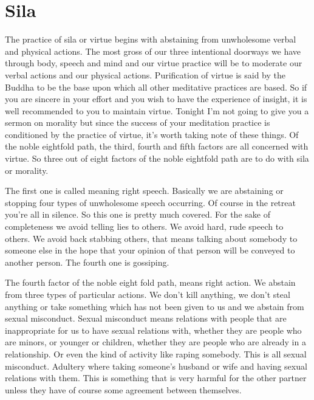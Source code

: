 \documentclass[letterpaper,10pt,english]{sphinxmanual}
\begin{document}
\section{Sila}
\label{\detokenize{0-b:sila}}
\sphinxAtStartPar
The  practice  of  sila  or  virtue  begins  with  abstaining  from  unwholesome  verbal  and  physical  actions. The  most  gross  of  our  three  intentional
doorways we have through body, speech and mind and our virtue practice
will be to moderate our verbal actions and our physical actions. Purification
of virtue is said by the Buddha to be the base upon which all other meditative practices are based. So if you are sincere in your effort and you wish to
have the experience of insight, it is well recommended to you to maintain
virtue. Tonight I’m not going to give you a sermon on morality but since the
success of your meditation practice is conditioned by the practice of virtue,
it’s worth taking note of these things. Of the noble eightfold path, the third,
fourth and fifth factors are all concerned with virtue. So three out of eight
factors of the noble eightfold path are to do with sila or morality.

\sphinxAtStartPar
The first one is called
meaning right speech. Basically we
are abstaining or stopping four types of unwholesome speech occurring. Of
course in the retreat you’re all in silence. So this one is pretty much covered.
For the sake of completeness we avoid telling lies to others. We avoid hard,
rude  speech  to  others.  We  avoid  back  stabbing  others,  that  means  talking
about somebody to someone else in the hope that your opinion of that person
will be conveyed to another person. The fourth one is gossiping.

\sphinxAtStartPar
The fourth factor of the noble eight fold path,
means
  right action. We abstain from three types of particular actions. We don’t kill
anything,  we  don’t  steal  anything  or  take  something  which  has  not  been
given  to  us  and  we  abstain  from  sexual  misconduct.  Sexual  misconduct
means relations with people that are inappropriate for us to have sexual relations with, whether they are people who are minors, or younger or children,
whether they are people who are already in a relationship. Or even the kind
of  activity  like  raping  somebody.  This  is  all  sexual  misconduct. Adultery
where taking someone’s husband or wife and having sexual relations with
them. This is something that is very harmful for the other partner unless they
have of course some agreement between themselves.
\end{document}
